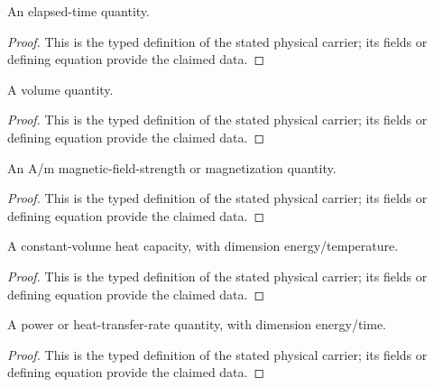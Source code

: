 \begin{definition}
  \label{def:physics:IPhO_2026_3_C_4:aux003}
  An elapsed-time quantity.
\end{definition}
\begin{proof}
  This is the typed definition of the stated physical carrier; its fields or defining equation provide the claimed data.
\end{proof}

\begin{definition}
  \label{def:physics:IPhO_2026_3_C_4:aux004}
  A volume quantity.
\end{definition}
\begin{proof}
  This is the typed definition of the stated physical carrier; its fields or defining equation provide the claimed data.
\end{proof}

\begin{definition}
  \label{def:physics:IPhO_2026_3_C_4:aux005}
  An A/m magnetic-field-strength or magnetization quantity.
\end{definition}
\begin{proof}
  This is the typed definition of the stated physical carrier; its fields or defining equation provide the claimed data.
\end{proof}

\begin{definition}
  \label{def:physics:IPhO_2026_3_C_4:aux006}
  A constant-volume heat capacity, with dimension energy/temperature.
\end{definition}
\begin{proof}
  This is the typed definition of the stated physical carrier; its fields or defining equation provide the claimed data.
\end{proof}

\begin{definition}
  \label{def:physics:IPhO_2026_3_C_4:aux007}
  A power or heat-transfer-rate quantity, with dimension energy/time.
\end{definition}
\begin{proof}
  This is the typed definition of the stated physical carrier; its fields or defining equation provide the claimed data.
\end{proof}

